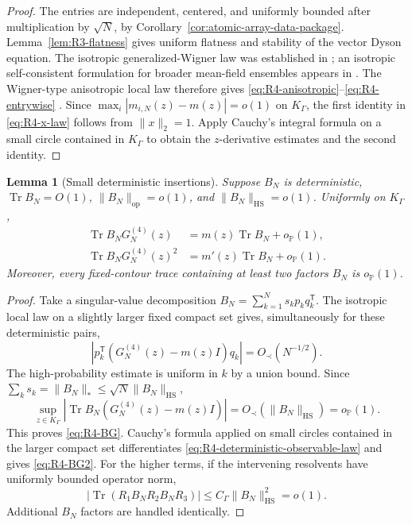 \documentclass[10pt,a4paper]{amsart}
\newtheorem{lemma}[theorem]{Lemma}
\newcommand{\Tr}{\operatorname{Tr}}
\newcommand{\op}{\mathrm{op}}
\newcommand{\HS}{\mathrm{HS}}
\newcommand{\norm}[1]{\lVert #1\rVert}
\begin{document}
\begin{proof}
The entries are independent, centered, and uniformly bounded after
multiplication by \(\sqrt N\), by
Corollary~\ref{cor:atomic-array-data-package}.  Lemma~\ref{lem:R3-flatness}
gives uniform flatness and stability of the vector Dyson equation.
The isotropic generalized-Wigner law was established in
\cite{BloemendalErdosKnowlesYauYin2014}; an isotropic self-consistent
formulation for broader mean-field ensembles appears in
\cite{HeKnowlesRosenthal2018}.
The Wigner-type anisotropic local law therefore gives
\eqref{eq:R4-anisotropic}--\eqref{eq:R4-entrywise}
\cite{AEK2017WignerType}.  Since
\(\max_i|m_{i,N}(z)-m(z)|=o(1)\) on \(K_\Gamma\), the first identity in
\eqref{eq:R4-x-law} follows from \(\norm{x}_2=1\).  Apply Cauchy's integral
formula on a small circle contained in \(K_\Gamma\) to obtain the
\(z\)-derivative estimates and the second identity.
\end{proof}

\begin{lemma}[Small deterministic insertions]
\label{lem:R4-small-insertion}
Suppose \(B_N\) is deterministic,
\(\Tr B_N=O(1)\), \(\norm{B_N}_{\op}=o(1)\), and
\(\norm{B_N}_{\HS}=o(1)\).  Uniformly on \(K_\Gamma\),
\begin{align}
 \Tr B_NG_N^{(4)}(z)&=m(z)\Tr B_N+o_{\mathbb P}(1),\label{eq:R4-BG}\\
 \Tr B_NG_N^{(4)}(z)^2&=m'(z)\Tr B_N+o_{\mathbb P}(1).
 \label{eq:R4-BG2}
\end{align}
Moreover, every fixed-contour trace containing at least two factors \(B_N\)
is \(o_{\mathbb P}(1)\).
\end{lemma}

\begin{proof}
Take a singular-value decomposition
\(B_N=\sum_{k=1}^N s_kp_kq_k^{\mathsf T}\).  The isotropic local law on a
slightly larger fixed compact set gives, simultaneously for these
deterministic pairs,
\[
 \left|p_k^{\mathsf T}(G_N^{(4)}(z)-m(z)I)q_k\right|
 =O_\prec(N^{-1/2}).
\]
The high-probability estimate is uniform in \(k\) by a union bound.  Since
\(\sum_ks_k=\norm{B_N}_*\le\sqrt N\norm{B_N}_{\HS}\),
\begin{equation}\label{eq:R4-deterministic-observable-law}
 \sup_{z\in K_\Gamma}
 \left|\Tr B_N(G_N^{(4)}(z)-m(z)I)\right|
 =O_\prec(\norm{B_N}_{\HS})=o_{\mathbb P}(1).
\end{equation}
This proves \eqref{eq:R4-BG}.  Cauchy's formula applied on small circles
contained in the larger compact set differentiates
\eqref{eq:R4-deterministic-observable-law} and gives
\eqref{eq:R4-BG2}.  For the higher terms, if the intervening resolvents have
uniformly bounded operator norm,
\[
 |\Tr(R_1B_NR_2B_NR_3)|
 \le C_\Gamma\norm{B_N}_{\HS}^2=o(1).
\]
Additional \(B_N\) factors are handled identically.
\end{proof}
\end{document}
